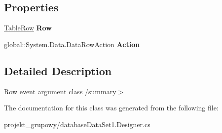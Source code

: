 \subsection*{Properties}
\begin{DoxyCompactItemize}
\item 
\mbox{\label{classprojekt__grupowy_1_1database_data_set1_1_1_table_row_change_event_adc892b45f5d466eb863c982393c12488}} 
\hyperlink{classprojekt__grupowy_1_1database_data_set1_1_1_table_row}{Table\+Row} {\bfseries Row}
\item 
\mbox{\label{classprojekt__grupowy_1_1database_data_set1_1_1_table_row_change_event_a3dde47339b69ab62914a0a85dee89834}} 
global\+::\+System.\+Data.\+Data\+Row\+Action {\bfseries Action}
\end{DoxyCompactItemize}


\subsection{Detailed Description}
Row event argument class /summary$>$ 

The documentation for this class was generated from the following file\+:\begin{DoxyCompactItemize}
\item 
projekt\+\_\+grupowy/database\+Data\+Set1.\+Designer.\+cs\end{DoxyCompactItemize}
